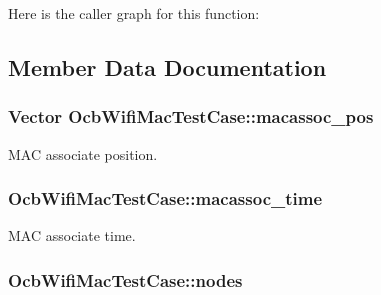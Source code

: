 Here is the caller graph for this function\+:




\subsection{Member Data Documentation}
\subsubsection[{\texorpdfstring{macassoc\+\_\+pos}{macassoc_pos}}]{\setlength{\rightskip}{0pt plus 5cm}Vector Ocb\+Wifi\+Mac\+Test\+Case\+::macassoc\+\_\+pos\hspace{0.3cm}{\ttfamily [private]}}\hypertarget{classOcbWifiMacTestCase_a428f0d3f034ce62204bb6977125e8b3f}{}\label{classOcbWifiMacTestCase_a428f0d3f034ce62204bb6977125e8b3f}


M\+AC associate position. 

\subsubsection[{\texorpdfstring{macassoc\+\_\+time}{macassoc_time}}]{ Ocb\+Wifi\+Mac\+Test\+Case\+::macassoc\+\_\+time\hspace{0.3cm}{\ttfamily [private]}}\hypertarget{classOcbWifiMacTestCase_aa00335f700f1c4a5b9890e5de5470eb3}{}\label{classOcbWifiMacTestCase_aa00335f700f1c4a5b9890e5de5470eb3}


M\+AC associate time. 

\subsubsection[{\texorpdfstring{nodes}{nodes}}]{ Ocb\+Wifi\+Mac\+Test\+Case\+::nodes\hspace{0.3cm}{\ttfamily [private]}}\hypertarget{classOcbWifiMacTestCase_ae01930c670f59939ba7678a09302774f}{}\label{classOcbWifiMacTestCase_ae01930c670f59939ba7678a09302774f}


